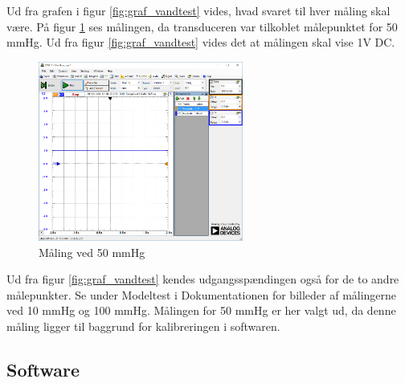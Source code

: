Ud fra grafen i figur \ref{fig:graf_vandtest} vides, hvad svaret til hver måling skal være. På figur \ref{fig:vandtest_måling50} ses målingen, da transduceren var tilkoblet målepunktet for 50 mmHg. Ud fra figur \ref{fig:graf_vandtest} vides det at målingen skal vise 1V DC.  
\begin{figure}[H]
	\centering	\includegraphics[width=0.6\textwidth]{Figurer/50mmhg}
	\caption{Måling ved 50 mmHg}
	\label{fig:vandtest_måling50}
\end{figure}
Ud fra figur \ref{fig:graf_vandtest} kendes udgangsspændingen også for de to andre målepunkter. Se under Modeltest i Dokumentationen for billeder af målingerne ved 10 mmHg og 100 mmHg. Målingen for 50 mmHg er her valgt ud, da denne måling ligger til baggrund for kalibreringen i softwaren. 

\subsection{Software}


